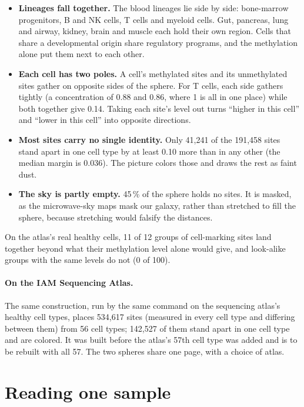 \begin{itemize}
\item \textbf{Lineages fall together.} The blood lineages lie side by side: bone-marrow progenitors, B and NK cells, T cells and myeloid
cells. Gut, pancreas, lung and airway, kidney, brain and muscle each hold their own region. Cells that share a developmental origin share
regulatory programs, and the methylation alone put them next to each other.
\item \textbf{Each cell has two poles.} A cell's methylated sites and its unmethylated sites gather on opposite sides of the sphere. For T
cells, each side gathers tightly (a concentration of 0.88 and 0.86, where 1 is all in one place) while both together give 0.14. Taking
each site's level out turns ``higher in this cell'' and ``lower in this cell'' into opposite directions.
\item \textbf{Most sites carry no single identity.} Only 41{,}241 of the 191{,}458 sites stand apart in one cell type by at least 0.10
more than in any other (the median margin is 0.036). The picture colors those and draws the rest as faint dust.
\item \textbf{The sky is partly empty.} 45\,\% of the sphere holds no sites. It is masked, as the microwave-sky maps mask our galaxy,
rather than stretched to fill the sphere, because stretching would falsify the distances.
\end{itemize}

On the atlas's real healthy cells, 11 of 12 groups of cell-marking sites land together beyond what their methylation level alone would
give, and look-alike groups with the same levels do not (0 of 100).

\paragraph{On the IAM Sequencing Atlas.} The same construction, run by the same command on the sequencing atlas's healthy cell types,
places 534{,}617 sites (measured in every cell type and differing between them) from 56 cell types; 142{,}527 of them stand apart in one
cell type and are colored. It was built before the atlas's 57th cell type was added and is to be rebuilt with all 57. The two spheres share
one page, with a choice of atlas.

\section{Reading one sample}

